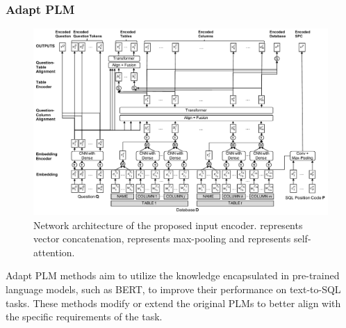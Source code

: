 \subsubsection{Adapt PLM} %
\label{sec:adaptplm}

\begin{figure}[H]
    \centering
    \includegraphics[width=\textwidth]{pics/enc/fig_encode}
    \caption{Network architecture of the proposed input encoder.  represents vector concatenation,  represents max-pooling and  represents self-attention.\cite{choi_ryansql_2020}}
    \label{fig:ryan}
\end{figure}

Adapt \ac{PLM} methods aim to utilize the knowledge encapsulated in pre-trained language models, such as BERT\cite{DBLP:journals/corr/abs-1810-04805}, to improve their performance on text-to-SQL tasks. These methods modify or extend the original PLMs to better align with the specific requirements of the task.

